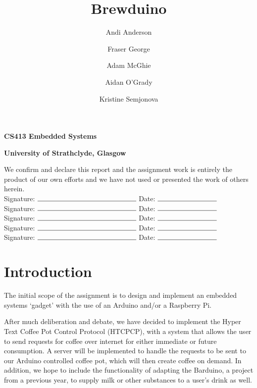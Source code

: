 \documentclass[12pt, a4paper]{article}
\newenvironment{signatures}{\par\vspace*{\fill}}{\clearpage}
\begin{document}
\title{Brewduino}
\author{
	Andi Anderson
	\and
	Fraser George
	\and
	Adam McGhie
	\and
	Aidan O'Grady
	\and
	Kristine Semjonova
}
\date{}
\maketitle

\begin{signatures}
\noindent \textbf{CS413 Embedded Systems}

\noindent \textbf{University of Strathclyde, Glasgow}\\

\newpage

We confirm and declare this report and the assignment work is entirely
the product of our own efforts and we have not used or presented the work of
others herein.\\

Signature: $\rule{5cm}{0.15mm}$ \hfill Date: $\rule{3cm}{0.15mm}$ \\

Signature: $\rule{5cm}{0.15mm}$ \hfill Date: $\rule{3cm}{0.15mm}$ \\

Signature: $\rule{5cm}{0.15mm}$ \hfill Date: $\rule{3cm}{0.15mm}$ \\

Signature: $\rule{5cm}{0.15mm}$ \hfill Date: $\rule{3cm}{0.15mm}$ \\

Signature: $\rule{5cm}{0.15mm}$ \hfill Date: $\rule{3cm}{0.15mm}$
\end{signatures}
\newpage
\tableofcontents
\newpage


\section{Introduction}
The initial scope of the assignment is to design and implement an embedded
systems ‘gadget’ with the use of an Arduino and/or a Raspberry Pi.

After much deliberation and debate, we have decided to implement the Hyper Text 
Coffee Pot Control Protocol (HTCPCP)\cite{HTCPCP}, with a system that allows
the user to send requests for coffee over  internet for either immediate or
future consumption. A server will be implemented to handle the requests to be
sent to our Arduino controlled coffee pot, which will then create coffee on
demand. In addition, we hope to include the functionality of adapting the
Barduino, a project from a previous year, to supply milk or other substances to
a user’s drink as well.
\newpage
\end{document}
